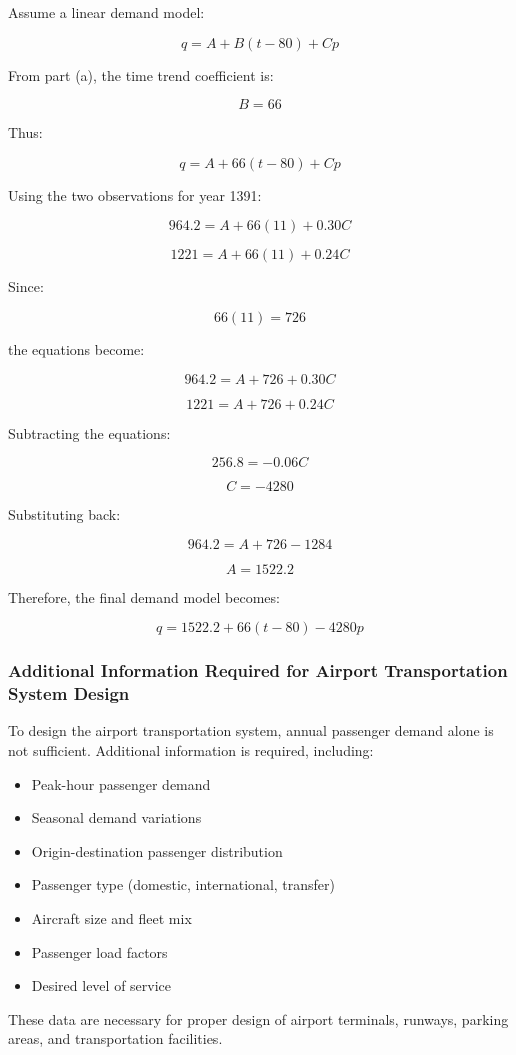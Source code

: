 \documentclass{KPS_assignment}
\begin{document}
Assume a linear demand model:

\[
q=A+B(t-80)+Cp
\]

From part (a), the time trend coefficient is:

\[
B=66
\]

Thus:

\[
q=A+66(t-80)+Cp
\]

Using the two observations for year 1391:

\[
964.2=A+66(11)+0.30C
\]

\[
1221=A+66(11)+0.24C
\]

Since:

\[
66(11)=726
\]

the equations become:

\[
964.2=A+726+0.30C
\]

\[
1221=A+726+0.24C
\]

Subtracting the equations:

\[
256.8=-0.06C
\]

\[
C=-4280
\]

Substituting back:

\[
964.2=A+726-1284
\]

\[
A=1522.2
\]

Therefore, the final demand model becomes:

\[
\boxed{
q=1522.2+66(t-80)-4280p
}
\]



\subsubsection{Additional Information Required for Airport Transportation System Design}

To design the airport transportation system, annual passenger demand alone is not sufficient. Additional information is required, including:

\begin{itemize}
    \item Peak-hour passenger demand
    \item Seasonal demand variations
    \item Origin-destination passenger distribution
    \item Passenger type (domestic, international, transfer)
    \item Aircraft size and fleet mix
    \item Passenger load factors
    \item Desired level of service
\end{itemize}

These data are necessary for proper design of airport terminals, runways, parking areas, and transportation facilities.
\end{document}
